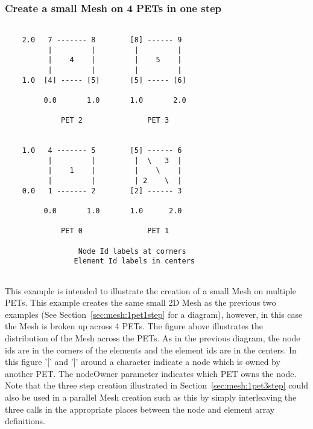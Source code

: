   \subsubsection{Create a small Mesh on 4 PETs in one step}
  \label{sec:mesh:4pet1step}
  \begin{minipage}{\linewidth} 
  \begin{verbatim}
  
    2.0   7 ------- 8        [8] ------ 9          
          |         |         |         |
          |    4    |         |    5    |
          |         |         |         |
    1.0  [4] ----- [5]       [5] ----- [6]
          
         0.0       1.0       1.0       2.0
  
             PET 2               PET 3
  
  
    1.0   4 ------- 5        [5] ------ 6
          |         |         |  \   3  |
          |    1    |         |    \    |
          |         |         | 2    \  |
    0.0   1 ------- 2        [2] ------ 3
  
         0.0       1.0       1.0      2.0 
   
             PET 0               PET 1
  
                 Node Id labels at corners
                Element Id labels in centers
  
  \end{verbatim}
  \end{minipage}
   
   This example is intended to illustrate the creation of a small Mesh on multiple PETs. This example creates the same small 2D Mesh as the 
   previous two examples (See Section~\ref{sec:mesh:1pet1step} for a diagram), however, in this case the Mesh is broken up across 4 PETs. 
   The figure above illustrates the distribution of the Mesh across the PETs. As in the previous diagram, the node ids are in
   the corners of the elements and the element ids are in the centers. In this figure '[' and ']' around a character indicate a node which
   is owned by another PET. The nodeOwner parameter indicates which PET owns the node.  Note that the three step creation 
   illustrated in Section~\ref{sec:mesh:1pet3step} could also be used in a parallel Mesh creation such as this by simply interleaving 
   the three calls in the appropriate places between the node and element array definitions. 
   

